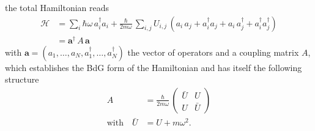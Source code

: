 the total Hamiltonian reads
\begin{align*}
    \mathcal{H} &= \sum_i \hbar\omega\,a_i^\dagger a_i +\frac{\hbar}{2m\omega}\, \sum_{i,j} U_{i,j}\,\left(a_i\,a_j + a_i^\dagger a_j + a_i\,a_j^\dagger + a_i^\dagger a_j^\dagger \right)\\
    &= \mathbf{a}^\dagger\,A\,\mathbf{a}
\end{align*}
with $\mathbf{a}=(a_1,\dots,a_N,a_1^\dagger,\dots,a_N^\dagger)$ the vector of operators and a coupling matrix $A$, which establishes the BdG form of the Hamiltonian and has itself the following structure
\begin{align*}
    A &= \frac{\hbar}{2m\omega}\,\begin{pmatrix}
       \bar{U} & U \\
       U & \bar{U}
    \end{pmatrix}\\
    \text{with}\quad \bar{U}&= U+m\omega^2.
\end{align*}


